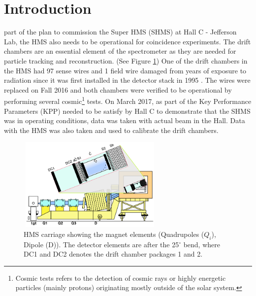 \documentclass[journal, a4paper]{IEEEtran}
\begin{document}
\section{Introduction}
 part of the plan to commission the Super HMS (SHMS) at Hall C - Jefferson Lab, the
HMS also needs to be operational for coincidence experiments. The drift chambers are an essential element
of the spectrometer as they are needed for particle tracking and reconstruction. (See Figure \ref{fig:HMS_carriage}) One of the drift chambers
in the HMS had 97 sense wires and 1 field wire damaged from years of exposure to radiation since it was first
installed in the detector stack in 1995 \cite{baker}. The  wires were replaced on Fall 2016 and both chambers
were verified to be operational by performing several cosmic\footnote{Cosmic tests refers to the detection of cosmic rays or highly energetic particles (mainly
protons) originating mostly outside of the solar system.} tests. On March 2017, as part of the Key Performance Parameters (KPP)
needed to be satisfy by Hall C to demonstrate that the SHMS was in operating conditions, data was taken with actual beam in the
Hall. Data with the HMS was also taken and used to calibrate the drift chambers.
\begin{figure}[h]
  \centering
  \includegraphics[width=2.8in, height=1.8in]{HMS_Carriage.png}
  \caption{HMS carriage showing the magnet elements (Quadrupoles ($Q_{i}$), Dipole (D)). The detector elements are
  after the 25$^{\circ}$ bend, where DC1 and DC2 denotes the drift chamber
  packages 1 and 2.}
  \label{fig:HMS_carriage}
\end{figure}
\end{document}
